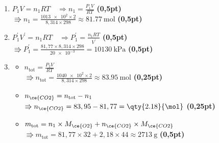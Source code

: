 \begin{enumerate}
    \item $P_1V=n_1RT \quad\Rightarrow n_1=\frac{P_1V}{RT}$
          \hfill\textbf{(0,5pt)}
          \\
          $\Rrightarrow n_{1}=\frac{\num{1013e2}\times2}{8,314\times298}
          \approx\qty{81.77}{\mol}$
          \hfill\textbf{(0,5pt)}
    \item $P_1^{\prime}V^{\prime}=n_1RT \quad\Rightarrow
          P_1^{\prime}=\frac{n_1 R T}{V^{\prime}}$
          \hfill\textbf{(0,5pt)}
          \\[2mm]
          $\Rrightarrow P_{1}^{\prime}=
           \frac{81,77\times8,314\times298}{\num{20e-3}}=
           \qty{10130}{\kPa}$
          \hfill\textbf{(0,5pt)}
    \item 
          \begin{itemize}
              \item $n_{\text{tot}}=\frac{P_{2}V}{RT}$ \\
                    $\Rrightarrow n_{\text{tot}}=
                    \frac{\num{1040e2}\times2}{8,314\times298}
                    \approx\qty{83.95}{\mol}$
                    \hfill\textbf{(0,25pt)}
              \item $n_{\ce{CO2}}=n_{\text{tot}}-n_{1}$ \\
                    $\Rrightarrow n_{\ce{CO2}}=83,95-81,77=\qty{2.18}{\mol}$
                    \hfill\textbf{(0,25pt)}
              \item $m_{\text{tot}}=
                    n_{1}\times M_{\ce{O2}}+n_{\ce{CO2}}\times M_{\ce{CO2}}$ \\
                    $\Rrightarrow m_{\text{tot}}=81,77\times32+2,18\times44
                    \approx\qty{2713}{\g}$
                    \hfill\textbf{(0,5pt)}
          \end{itemize}
\end{enumerate}
